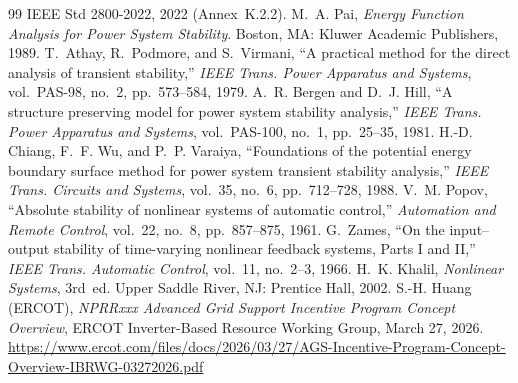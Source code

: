 \documentclass[11pt]{article}
\begin{document}
\begin{thebibliography}{99}
IEEE Std 2800-2022, 2022 (Annex~K.2.2).
 M.~A. Pai, \emph{Energy Function Analysis for Power
System Stability}. Boston, MA: Kluwer Academic Publishers, 1989.
 T.~Athay, R.~Podmore, and S.~Virmani, ``A practical
method for the direct analysis of transient stability,'' \emph{IEEE
Trans. Power Apparatus and Systems}, vol.~PAS-98, no.~2, pp.~573--584,
1979.
 A.~R. Bergen and D.~J. Hill, ``A structure
preserving model for power system stability analysis,'' \emph{IEEE
Trans. Power Apparatus and Systems}, vol.~PAS-100, no.~1, pp.~25--35,
1981.
 H.-D. Chiang, F.~F. Wu, and P.~P. Varaiya,
``Foundations of the potential energy boundary surface method for power
system transient stability analysis,'' \emph{IEEE Trans. Circuits and
Systems}, vol.~35, no.~6, pp.~712--728, 1988.
 V.~M. Popov, ``Absolute stability of nonlinear
systems of automatic control,'' \emph{Automation and Remote Control},
vol.~22, no.~8, pp.~857--875, 1961.
 G.~Zames, ``On the input--output stability of
time-varying nonlinear feedback systems, Parts I and II,''
\emph{IEEE Trans. Automatic Control}, vol.~11, no.~2--3, 1966.
 H.~K. Khalil, \emph{Nonlinear Systems}, 3rd~ed.
Upper Saddle River, NJ: Prentice Hall, 2002.
 S.-H. Huang (ERCOT), \emph{NPRRxxx Advanced Grid
Support Incentive Program Concept Overview}, ERCOT Inverter-Based
Resource Working Group, March 27, 2026.
\url{https://www.ercot.com/files/docs/2026/03/27/AGS-Incentive-Program-Concept-Overview-IBRWG-03272026.pdf}


\end{thebibliography}
\end{document}
